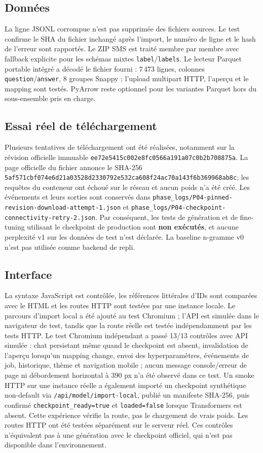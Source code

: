 \documentclass[11pt,a4paper]{article}
\begin{document}
\subsection{Données}
La ligne JSONL corrompue n'est pas supprimée des fichiers sources. Le test confirme le SHA du fichier inchangé après l'import, le numéro de ligne et le hash de l'erreur sont rapportés. Le ZIP SMS est traité membre par membre avec fallback explicite pour les schémas mixtes \texttt{label}/\texttt{labels}. Le lecteur Parquet portable intégré a décodé le fichier fourni : 7\,473 lignes, colonnes \texttt{question}/\texttt{answer}, 8 groupes Snappy ; l’upload multipart HTTP, l’aperçu et le mapping sont testés. PyArrow reste optionnel pour les variantes Parquet hors du sous-ensemble pris en charge.

\subsection{Essai réel de téléchargement}
Plusieurs tentatives de téléchargement ont été réalisées, notamment sur la révision officielle immuable \texttt{ee72e5415c002e8fc0566a191a07c0b2b708875a}. La page officielle du fichier annonce le SHA-256 \texttt{5af571cbf074e6d21a03528d2330792e532ca608f24ac70a143f6b369968ab8c}; les requêtes du conteneur ont échoué sur le réseau et aucun poids n’a été créé. Les événements et leurs sorties sont conservés dans \texttt{phase\_logs/P04-pinned-revision-download-attempt-1.json} et \texttt{phase\_logs/P04-checkpoint-connectivity-retry-2.json}. Par conséquent, les tests de génération et de fine-tuning utilisant le checkpoint de production sont \textbf{non exécutés}, et aucune perplexité v1 sur les données de test n'est déclarée. La baseline n-gramme v0 n'est pas utilisée comme backend de repli.

\subsection{Interface}
La syntaxe JavaScript est contrôlée, les références littérales d'IDs sont comparées avec le HTML et les routes HTTP sont testées par une instance locale. Le parcours d’import local a été ajouté au test Chromium ; l’API est simulée dans le navigateur de test, tandis que la route réelle est testée indépendamment par les tests HTTP. Le test Chromium indépendant a passé 13/13 contrôles avec API simulée : chat persistant même quand le checkpoint est absent, invalidation de l'aperçu lorsqu'un mapping change, envoi des hyperparamètres, événements de job, historique, thème et navigation mobile ; aucun message console/erreur de page ni débordement horizontal à 390 px n'a été observé dans ce test. Un smoke HTTP sur une instance réelle a également importé un checkpoint synthétique non-default via \texttt{/api/model/import-local}, publié un manifeste SHA-256, puis confirmé \texttt{checkpoint\_ready=true} et \texttt{loaded=false} lorsque Transformers est absent. Cette expérience vérifie la route, pas le chargement de vrais poids. Les routes HTTP ont été testées séparément sur le serveur réel. Ces contrôles n'équivalent pas à une génération avec le checkpoint officiel, qui n'est pas disponible dans l'environnement.
\end{document}
